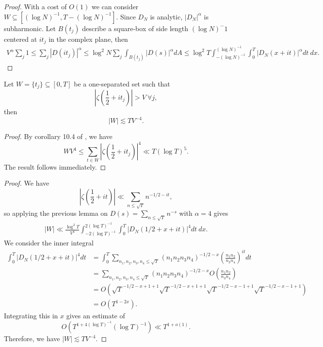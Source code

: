 \begin{proof}
    With a cost of $O(1)$ we can consider $W\subseteq [(\log N)^{-1}, T-(\log N)^{-1}]$.
    Since $D_N$ is analytic, $|D_N|^\alpha$ is subharmonic. Let $B(t_j)$ describe a square-box of side length $(\log N)^-1$ centered at $it_j$ in the complex plane, then \begin{align*}
        V^\alpha \sum_{j} 1 \leq \sum_{j}|D(it_j)|^\alpha \leq \log^2 N \sum_{j} \int_{B(t_j)} |D(s)|^\alpha dA \leq \log^2 T \int_{-(\log N)^{-1}}^{(\log N)^{-1}}
        \int_{0}^{T} |D_N(x+it)|^\alpha dt \ dx.
    \end{align*}
\end{proof}
\fi
\begin{lemma} \label{halflinebigvalue}
   Let $W = \{t_j\}\subseteq [0,T]$ be a one-separated set such that \[
        \left|\zeta\left(\frac{1}{2}+it_j\right)\right|>V \ \forall j,
    \]
    then \[
    |W|\lesssim TV^{-4}.
    \]
\end{lemma}
\begin{proof}
    By corollary 10.4 of \cite{Montgomery}, we have \[
        W V^4 \leq \sum_{t\in W}  \left|\zeta\left(\frac{1}{2}+it_j\right)\right|^4 \ll T(\log T)^5.
    \]
    The result follows immediately.
\end{proof}
\iffalse
\begin{proof}
    We have \[
        \left|\zeta\left(\frac{1}{2}+it\right)\right|\ll \sum_{n\leq \sqrt{T}}n^{-1/2-it},
    \]
    so applying the previous lemma on $D(s)=\sum_{n\leq \sqrt{T}}n^{-s}$ with $\alpha=4$ gives \begin{align*}
        |W|\ll \frac{\log ^2 T}{V^4} \int_{-2(\log T)^{-1}}^{2(\log T)^{-1}}
        \int_{0}^{T} |D_N(1/2+x+it)|^4 dt \ dx.
    \end{align*}
    We consider the inner integral \begin{align*}
        \int_{0}^{T} |D_N(1/2+x+it)|^4 dt &=
        \int_{0}^{T} \sum_{n_1,n_2,n_3,n_4\leq \sqrt{T}}(n_1n_2n_3n_4)^{-1/2-x}\left(\frac{n_1n_2}{n_3n_4}\right)^{it} dt\\
        &=\sum_{n_1,n_2,n_3,n_4\leq \sqrt{T}}(n_1n_2n_3n_4)^{-1/2-x}O\left(\frac{n_1n_2}{n_3n_4}\right)\\
        &=O(\sqrt{T}^{-1/2-x+1+1}\sqrt{T}^{-1/2-x+1+1}\sqrt{T}^{-1/2-x-1+1}\sqrt{T}^{-1/2-x-1+1})\\
        &=O(T^{1-2x}).
    \end{align*}
    Integrating this in $x$ gives an estimate of \[
    O(T^{1+4(\log T)^{-1}}(\log T)^{-1})\ll T^{1+o(1)}    .\]
    Therefore, we have $|W|\lesssim TV^{-4}$.
\end{proof}
